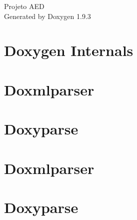 \documentclass[twoside]{book}
\newcommand{\+}{\discretionary{\mbox{\scriptsize$\hookleftarrow$}}{}{}}
\newcommand{\clearemptydoublepage}{%
    \newpage{\pagestyle{empty}\cleardoublepage}%
  }
\begin{document}
  \raggedbottom
    \hypersetup{pageanchor=false,
                bookmarksnumbered=true,
                pdfencoding=unicode
               }
  \begin{titlepage}
  \vspace*{7cm}
  \begin{center}%
  {\Large Projeto AED}\\
  \vspace*{1cm}
  {\large Generated by Doxygen 1.9.3}\\
  \end{center}
  \end{titlepage}
  \clearemptydoublepage
  \tableofcontents
  \clearemptydoublepage
  \hypersetup{pageanchor=true}
\chapter{Doxygen Internals}
\label{index}\hypertarget{index}{}
\chapter{Doxmlparser}
\label{md_doxygen_addon_doxmlparser__r_e_a_d_m_e}

\chapter{Doxyparse}
\label{md_doxygen_addon_doxyparse__r_e_a_d_m_e}

\chapter{Doxmlparser}
\label{md_doxygen_build_doxygen_addon_doxmlparser__r_e_a_d_m_e}

\chapter{Doxyparse}
\label{md_doxygen_build_doxygen_addon_doxyparse__r_e_a_d_m_e}

\end{document}
